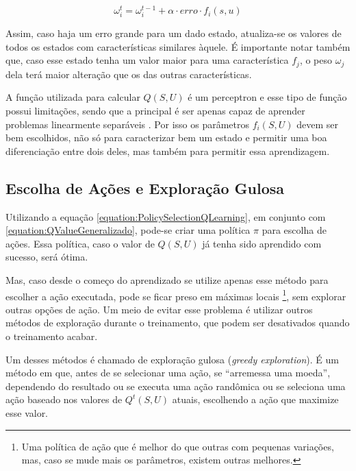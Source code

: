 \begin{equation} \label{equation:OmegaUpdate1}
	\omega_i^t = \omega_i^{t-1} + \alpha \cdot erro \cdot f_i \left( s, u \right)
\end{equation}

Assim, caso haja um erro grande para um dado estado, atualiza-se os valores de todos os estados com características similares àquele. É importante notar também que, caso esse estado tenha um valor maior para uma característica $ f_j $, o peso $ \omega_j $ dela terá maior alteração que os das outras características.

A função utilizada para calcular $ Q \left( S, U \right) $ é um perceptron e esse tipo de função possui limitações, sendo que a principal é ser apenas capaz de aprender problemas linearmente separáveis \cite{Haykin:1998:NNC:521706,priddy2005artificial}. Por isso os parâmetros $ f_i \left( S, U \right) $ devem ser bem escolhidos, não só para caracterizar bem um estado e permitir uma boa diferenciação entre dois deles, mas também para permitir essa aprendizagem.

\subsection{Escolha de Ações e Exploração Gulosa} \label{subsection:EscolhaDeAçõesExploraçãoGulosa}

Utilizando a equação \ref{equation:PolicySelectionQLearning}, em conjunto com \ref{equation:QValueGeneralizado}, pode-se criar uma política $ \pi $ para escolha de ações. Essa política, caso o valor de $ Q \left( S, U \right) $ já tenha sido aprendido com sucesso, será ótima.

Mas, caso desde o começo do aprendizado se utilize apenas esse método para escolher a ação executada, pode se ficar preso em máximas locais%
\footnote{Uma política de ação que é melhor do que outras com pequenas variações, mas, caso se mude mais os parâmetros, existem outras melhores.%
}, sem explorar outras opções de ação. Um meio de evitar esse problema é utilizar outros métodos de exploração durante o treinamento, que podem ser desativados quando o treinamento acabar. 

Um desses métodos é chamado de exploração gulosa (\textit{greedy exploration}). É um método em que, antes de se selecionar uma ação, se ``arremessa uma moeda'', dependendo do resultado ou se executa uma ação randômica ou se seleciona uma ação baseado nos valores de $ Q^t \left( S, U \right) $ atuais, escolhendo a ação que maximize esse valor.

